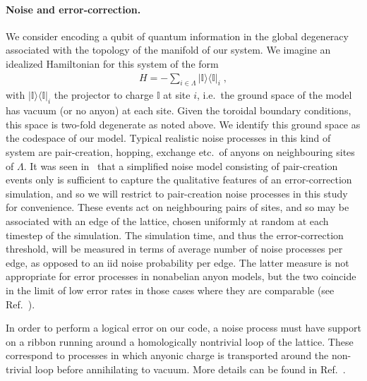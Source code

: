 \documentclass[aps, prl, letterpaper, twocolumn, superscriptaddress, notitlepage, 10pt]{revtex4-1}
\newcommand{\ket}[1]{|{#1}\rangle}
\newcommand{\bra}[1]{\langle{#1}|}
\newcommand{\ketbra}[2]{\ket{#1}\!\bra{#2}}
\newcommand{\proj}[1]{\ketbra{#1}{#1}}
\begin{document}
\paragraph{Noise and error-correction.}

We consider encoding a qubit of quantum information in the global degeneracy associated 
with the topology of the manifold of our system. We imagine an idealized Hamiltonian for this 
system of the form
\begin{align}
	H=-\sum_{i\in \Lambda}\proj{\mathbb{I}}_i\;,\label{e:hamiltonian}
\end{align}
with $\proj{\mathbb{I}}_i$ the projector to charge $\mathbb{I}$ at site $i$, i.e.~the ground 
space of the model has vacuum (or no anyon) at each site. Given the toroidal boundary 
conditions, this space is two-fold degenerate as noted above. We identify this ground space 
as the codespace of our model. Typical realistic noise processes in this kind of system are 
pair-creation, hopping, exchange etc.~of anyons on neighbouring sites of $\Lambda$. It was 
seen in~\cite{Brell2013} that a simplified noise model consisting of pair-creation events only 
is sufficient to capture the qualitative features of an error-correction simulation, and so we 
will restrict to pair-creation noise processes in this study for convenience. These events act 
on neighbouring pairs of sites, and so may be associated with an edge of the lattice, chosen 
uniformly at random at each timestep of the simulation. The simulation time, and thus the 
error-correction threshold, will be measured in terms of average number of noise processes 
per edge, as opposed to an iid noise probability per edge. The latter measure is not 
appropriate for error processes in nonabelian anyon models, but the two coincide in the limit 
of low error rates in those cases where they are comparable (see Ref.~\cite{Brell2013}).

In order to perform a logical error on our code, a noise process must have support on a 
ribbon running around a homologically nontrivial loop of the lattice. These correspond to 
processes in which anyonic charge is transported around the non-trivial loop before 
annihilating to vacuum. More details can be found in Ref.~\cite{?}.
\end{document}
